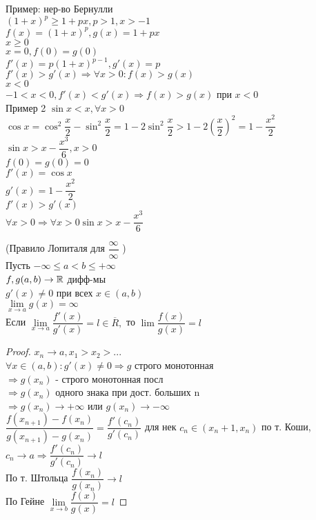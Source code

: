 Пример: нер-во Бернулли \\
$ (1+x)^p \geq 1 + px, p > 1, x > -1 $ \\
$ f(x) = (1+x)^p, g(x) = 1 + px $ \\
$ x \geq 0 $ \\
$ x = 0, f(0) = g(0)  $ \\
$ f'(x) = p(1+x)^{p-1}, g'(x) = p $\\
$ f'(x) > g'(x) \Rightarrow \forall x > 0: f(x) > g(x) $ \\
$ x < 0 $ \\
$ -1 < x < 0, f'(x) < g'(x) \Rightarrow f(x) > g(x) $ при $ x < 0 $ \\

Пример 2 $ \sin x < x, \forall x > 0 $ \\
$ \cos x = \cos^2 \dfrac{x}{2} - \sin^2 \dfrac{x}{2} = 1 - 2\sin^2 \dfrac{x}{2} > 1 - 2 \left(\dfrac{x}{2}\right)^2 = 1 - \dfrac{x^2}{2} $ \\
$ \sin x > x - \dfrac{x^3}{6}, x > 0 $ \\
$ f(0) = g(0) = 0 $ \\
$ f'(x) = \cos x $ \\
$ g'(x) = 1 - \dfrac{x^2}{2} $ \\
$ f'(x) > g'(x) $ \\
$ \forall x > 0 \Rightarrow \forall x > 0\sin x > x - \dfrac{x^3}{6} $ \\




\begin{theorem} (Правило Лопиталя для $ \dfrac{\infty}{\infty} $ )\\
	Пусть $ -\infty \leq a < b \leq +\infty $ \\
	$ f, g (a, b) \rightarrow \mathbb{R} $ дифф-мы \\
	$ g'(x) \neq 0 $ при всех $ x \in (a, b) $\\
	$ \lim\limits_{x \rightarrow a} g(x) = \infty $ \\
	Если  $ \lim\limits_{x \rightarrow a} \dfrac{f'(x)}{g'(x)} = l \in \overline{R}, $ то $ \lim \dfrac{f(x)}{g(x)} = l $ 
	\begin{proof}
		$ x_n \rightarrow a, x_1 > x_2 > ... $ \\
		$ \forall x \in (a,b) : g'(x) \neq 0 \Rightarrow g $ строго монотонная \\
		$ \Rightarrow g(x_n) $ - строго монотонная посл \\
		$ \Rightarrow g(x_n) $ одного знака при дост. больших n \\
		$ \Rightarrow g(x_n) \rightarrow +\infty $ или $  g(x_n) \rightarrow -\infty $ \\
		$ \dfrac{f(x_{n+1}) - f(x_n)}{g(x_{n+1}) - g(x_n)} = \dfrac{f'(c_n)}{g'(c_n)} $ для нек $ c_n \in (x_n+1, x_n) $ по т. Коши, $ c_n \rightarrow a \Rightarrow \dfrac{f'(c_n)}{g'(c_n)} \rightarrow l $ \\
		По т. Штольца $ \dfrac{f(x_n)}{g(x_n)} \rightarrow l $ \\
		По Гейне $ \lim\limits_{x \rightarrow b} \dfrac{f(x)}{g(x)} = l$
	\end{proof}
\end{theorem}

